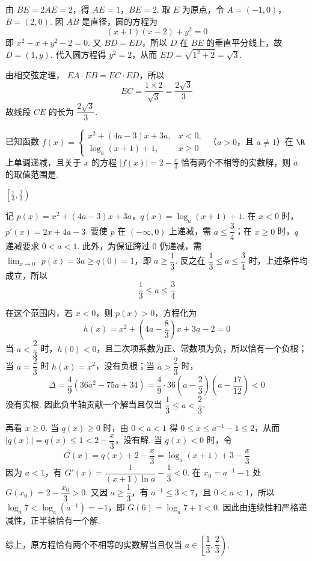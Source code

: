 \begin{solution}
由 \(BE=2AE=2\)，得 \(AE=1\)，\(BE=2\). 取 \(E\) 为原点，令
\(A=(-1,0)\)，\(B=(2,0)\). 因 \(AB\) 是直径，圆的方程为
\[
(x+1)(x-2)+y^2=0
\]
即 \(x^2-x+y^2-2=0\). 又 \(BD=ED\)，所以 \(D\) 在 \(BE\) 的垂直平分线上，故 \(D=(1,y)\). 代入圆方程得 \(y^2=2\)，从而
\(ED=\sqrt{1^2+2}=\sqrt3\).

由相交弦定理，
\(EA\cdot EB=EC\cdot ED\)，所以
\[
EC=\dfrac{1\times2}{\sqrt3}=\dfrac{2\sqrt3}{3}
\]
故线段 \(CE\) 的长为 \(\dfrac{2\sqrt3}{3}\).
\end{solution}

\begin{problem}
已知函数
\( f(x)=\begin{cases}
x^2+\left( 4a-3 \right)x+3a, & x<0,\\
\log_a\left( x+1 \right)+1, & x\ge 0
\end{cases} \)
（\( a>0 \)，且 \( a\ne 1 \)）在 \( \R \) 上单调递减，且关于 \( x \) 的方程 \( |f(x)|=2-\frac{x}{3} \) 恰有两个不相等的实数解，则 \( a \) 的取值范围是\fillinblank{}.
\end{problem}

\begin{answer}
\(\left[\frac13,\frac23\right)\)
\end{answer}

\begin{solution}
记 \(p(x)=x^2+(4a-3)x+3a\)，\(q(x)=\log_a(x+1)+1\). 在 \(x<0\) 时，
\(p'(x)=2x+4a-3\). 要使 \(p\) 在 \((-\infty,0)\) 上递减，需
\(a\leqslant\dfrac34\)；在 \(x\geqslant0\) 时，\(q\) 递减要求 \(0<a<1\). 此外，为保证跨过 \(0\) 仍递减，需
\(\displaystyle\lim_{x\to0^-}p(x)=3a\geqslant q(0)=1\)，即 \(a\geqslant\dfrac13\). 反之在
\(\dfrac13\leqslant a\leqslant\dfrac34\) 时，上述条件均成立，所以
\[
\dfrac13\leqslant a\leqslant\dfrac34
\]

在这个范围内，若 \(x<0\)，则 \(p(x)>0\)，方程化为
\[
h(x)=x^2+\left(4a-\dfrac83\right)x+3a-2=0
\]
当 \(a<\dfrac23\) 时，\(h(0)<0\)，且二次项系数为正、常数项为负，所以恰有一个负根；当 \(a=\dfrac23\) 时 \(h(x)=x^2\)，没有负根；当 \(a>\dfrac23\) 时，
\[
\Delta=\dfrac49(36a^2-75a+34)
=\dfrac49\cdot36\left(a-\dfrac23\right)\left(a-\dfrac{17}{12}\right)<0
\]
没有实根. 因此负半轴贡献一个解当且仅当
\(\dfrac13\leqslant a<\dfrac23\).

再看 \(x\geqslant0\). 当 \(q(x)\geqslant0\) 时，由 \(0<a<1\) 得
\(0\leqslant x\leqslant a^{-1}-1\leqslant2\)，从而
\(|q(x)|=q(x)\leqslant1<2-\dfrac{x}{3}\)，没有解. 当 \(q(x)<0\) 时，令
\[
G(x)=q(x)+2-\dfrac{x}{3}=\log_a(x+1)+3-\dfrac{x}{3}
\]
因为 \(a<1\)，有
\(G'(x)=\dfrac{1}{(x+1)\ln a}-\dfrac13<0\). 在
\(x_0=a^{-1}-1\) 处 \(G(x_0)=2-\dfrac{x_0}{3}>0\). 又因
\(a\geqslant\dfrac13\)，有 \(a^{-1}\leqslant3<7\)，且 \(0<a<1\)，所以
\(\log_a7<\log_a(a^{-1})=-1\)，即 \(G(6)=\log_a7+1<0\). 因此由连续性和严格递减性，正半轴恰有一个解.

综上，原方程恰有两个不相等的实数解当且仅当
\(a\in\left[\dfrac13,\dfrac23\right)\).
\end{solution}

